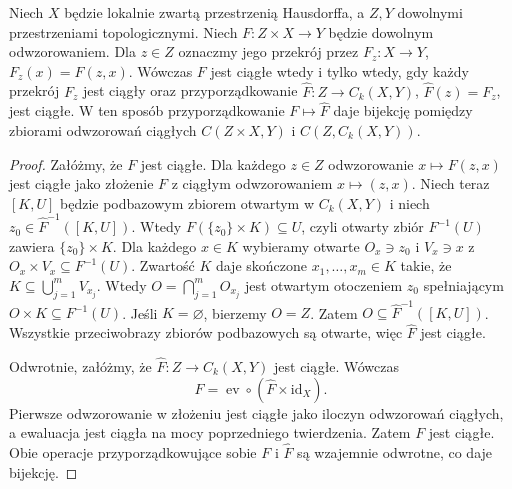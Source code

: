 \begin{twierdzenie}
\label{thm:topog-odwzorowania-wykladnicze}
Niech $X$ będzie lokalnie zwartą
przestrzenią Hausdorffa, a $Z,Y$
dowolnymi przestrzeniami topologicznymi.
Niech $F\colon Z\times X\to Y$
będzie dowolnym odwzorowaniem.
Dla $z\in Z$ oznaczmy jego przekrój
przez $F_z\colon X\to Y$,
$F_z(x)=F(z,x)$.
Wówczas $F$ jest ciągłe
wtedy i tylko wtedy, gdy
każdy przekrój $F_z$ jest ciągły
oraz przyporządkowanie
$\widehat F\colon Z\to C_k(X,Y)$,
$\widehat F(z)=F_z$,
jest ciągłe.
W ten sposób przyporządkowanie
$F\mapsto\widehat F$ daje
bijekcję pomiędzy zbiorami
odwzorowań ciągłych
$C(Z\times X,Y)$ i
$C(Z,C_k(X,Y))$.
\end{twierdzenie}
\begin{proof}
Załóżmy, że $F$ jest ciągłe.
Dla każdego $z\in Z$
odwzorowanie $x\mapsto F(z,x)$
jest ciągłe jako złożenie
$F$ z ciągłym odwzorowaniem
$x\mapsto(z,x)$.
Niech teraz $[K,U]$ będzie
podbazowym zbiorem otwartym
w $C_k(X,Y)$ i niech
$z_0\in\widehat F^{-1}([K,U])$.
Wtedy $F(\{z_0\}\times K)\subseteq U$,
czyli otwarty zbiór $F^{-1}(U)$
zawiera $\{z_0\}\times K$.
Dla każdego $x\in K$ wybieramy
otwarte $O_x\ni z_0$ i $V_x\ni x$
z $O_x\times V_x\subseteq F^{-1}(U)$.
Zwartość $K$ daje skończone
$x_1,\ldots,x_m\in K$ takie, że
$K\subseteq\bigcup_{j=1}^mV_{x_j}$.
Wtedy $O=\bigcap_{j=1}^mO_{x_j}$
jest otwartym otoczeniem $z_0$
spełniającym $O\times K\subseteq
F^{-1}(U)$.
Jeśli $K=\varnothing$, bierzemy $O=Z$.
Zatem $O\subseteq
\widehat F^{-1}([K,U])$.
Wszystkie przeciwobrazy
zbiorów podbazowych są otwarte,
więc $\widehat F$ jest ciągłe.

Odwrotnie, załóżmy, że
$\widehat F\colon Z\to C_k(X,Y)$
jest ciągłe. Wówczas
\[
F=\operatorname{ev}\circ
(\widehat F\times\mathrm{id}_X).
\]
Pierwsze odwzorowanie w złożeniu
jest ciągłe jako iloczyn
odwzorowań ciągłych, a ewaluacja
jest ciągła na mocy poprzedniego
twierdzenia. Zatem $F$ jest ciągłe.
Obie operacje przyporządkowujące
sobie $F$ i $\widehat F$ są
wzajemnie odwrotne, co daje bijekcję.
\end{proof}

